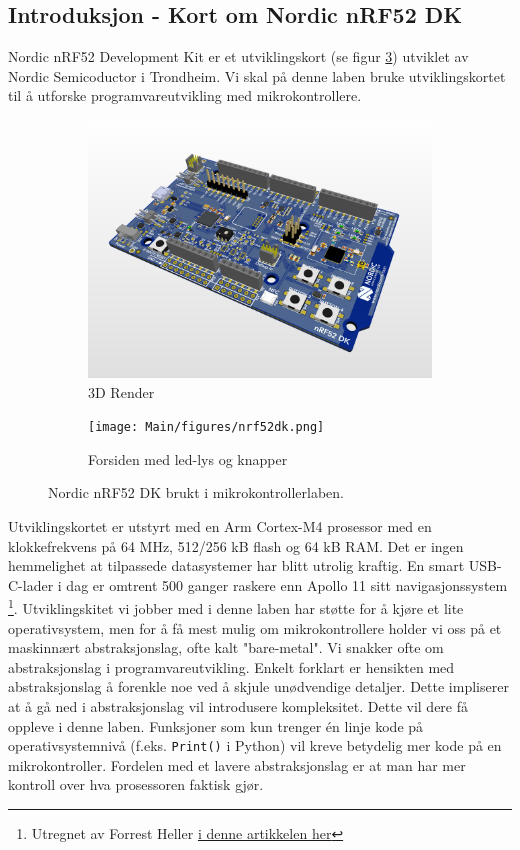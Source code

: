 \begin{alphasection}
\section{Introduksjon - Kort om Nordic nRF52 DK}
Nordic nRF52 Development Kit er et utviklingskort (se figur \ref{fig:nrf52dk}) utviklet av Nordic Semicoductor i Trondheim. Vi skal på denne laben bruke utviklingskortet til å utforske programvareutvikling med mikrokontrollere.

\begin{figure}[H]
    \centering
    \begin{subfigure}{0.5\textwidth}
    \centering
        \includegraphics[width=.8\linewidth]{Main/figures/nrf52dk_3d_render.png}
        \caption{3D Render}
        \label{fig:inclu}
    \end{subfigure}%
    \begin{subfigure}{0.5\textwidth}
    \centering
        \texttt{[image: Main/figures/nrf52dk.png]}
        \caption{Forsiden med led-lys og knapper}
        \label{fig:deform}
    \end{subfigure}
    \caption{Nordic nRF52 DK brukt i mikrokontrollerlaben.}
    \label{fig:nrf52dk}
\end{figure}


Utviklingskortet er utstyrt med en Arm Cortex-M4 prosessor med en klokkefrekvens på 64 MHz, 512/256 kB flash og  64 kB RAM. Det er ingen hemmelighet at tilpassede datasystemer har blitt utrolig kraftig. En smart USB-C-lader i dag er omtrent 500 ganger raskere enn Apollo 11 sitt navigasjonssystem \footnote{Utregnet av Forrest Heller \href{(https://forrestheller.com/Apollo-11-Computer-vs-USB-C-chargers.html)}{i denne artikkelen her}}. Utviklingskitet vi jobber med i denne laben har støtte for å kjøre et lite operativsystem, men for å få mest mulig om mikrokontrollere holder vi oss på et maskinnært abstraksjonslag, ofte kalt "bare-metal". Vi snakker ofte om abstraksjonslag i programvareutvikling. Enkelt forklart er hensikten med abstraksjonslag å forenkle noe ved å skjule unødvendige detaljer. Dette impliserer at å gå ned i abstraksjonslag vil introdusere kompleksitet. Dette vil dere få oppleve i denne laben. Funksjoner som kun trenger én linje kode på operativsystemnivå (f.eks. \verb|Print()| i Python) vil kreve betydelig mer kode på en mikrokontroller. Fordelen med et lavere abstraksjonslag er at man har mer kontroll over hva prosessoren faktisk gjør. 


\end{alphasection}
